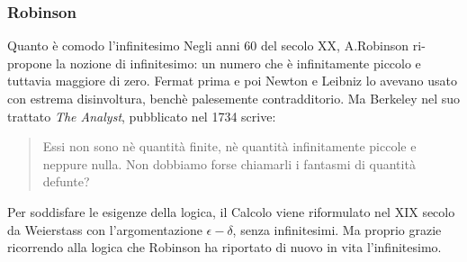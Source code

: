 \begin{frame}[label=Robinson]
  \frametitle{Robinson}
  \begin{block}{Quanto è comodo l'infinitesimo}
    Negli anni 60 del secolo XX, A.Robinson ri-propone la nozione di infinitesimo: un numero che è infinitamente piccolo
    e tuttavia maggiore di zero. Fermat prima e poi Newton e Leibniz lo avevano usato con estrema disinvoltura, benchè palesemente
    contradditorio. Ma Berkeley nel suo trattato \textit{The Analyst}, pubblicato nel 1734 scrive:
      \begin{quotation}
        Essi non sono nè quantità finite, nè quantità infinitamente piccole e neppure nulla. Non dobbiamo forse
        chiamarli i fantasmi di quantità defunte?
      \end{quotation}
      Per soddisfare le esigenze della logica, il Calcolo viene riformulato nel XIX secolo da Weierstass
      con l'argomentazione $\epsilon - \delta$, senza infinitesimi. 
      Ma proprio grazie ricorrendo alla logica che Robinson ha riportato di nuovo in vita l'infinitesimo.
    \end{block}
\end{frame}

